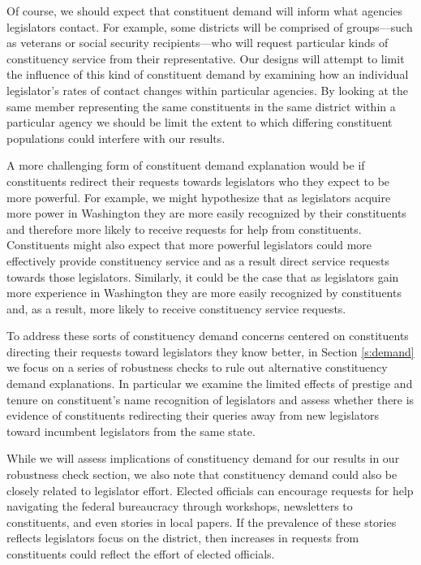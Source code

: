 \documentclass[12pt]{article}
\begin{document}
Of course, we should expect that constituent demand will inform what agencies legislators contact.  For example, some districts will be comprised of groups---such as veterans or social security recipients---who will request particular kinds of constituency service from their representative.  Our designs will attempt to limit the influence of this kind of constituent demand by examining how an individual legislator's rates of contact changes within particular agencies.  By looking at the same member representing the same constituents in the same district within a particular agency we should be limit the extent to which differing constituent populations could interfere with our results. 

A more challenging form of constituent demand explanation would be if constituents redirect their requests towards legislators who they expect to be more powerful.  For example, we might hypothesize that as legislators acquire more power in Washington they are more easily recognized by their constituents and therefore more likely to receive requests for help from constituents.  Constituents might also expect that more powerful legislators could more effectively provide constituency service and as a result direct service requests towards those legislators.  Similarly, it could be the case that as legislators gain more experience in Washington they are more easily recognized by constituents and, as a result, more likely to receive constituency service requests. 

To address these sorts of constituency demand concerns centered on constituents directing their requests toward legislators they know better, in Section \ref{s:demand} we focus on a series of robustness checks to rule out alternative constituency demand explanations. In particular we examine the limited effects of prestige and tenure on constituent's name recognition of legislators and assess whether there is evidence of constituents redirecting their queries away from new legislators toward incumbent legislators from the same state. 

While we will assess implications of constituency demand for our results in our robustness check section, we also note that constituency demand could also be closely related to legislator effort. Elected officials can encourage requests for help navigating the federal bureaucracy through workshops, newsletters to constituents, and even stories in local papers.  If the prevalence of these stories reflects legislators focus on the district, then increases in requests from constituents could reflect the effort of elected officials.  
\end{document}
